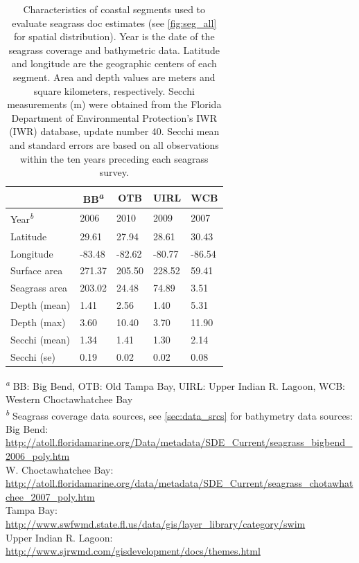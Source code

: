 \documentclass[letterpaper,12pt,oneside]{article}\usepackage[]{graphicx}\usepackage[]{color}
\begin{document}
\begin{table}[!tbp]
\caption{Characteristics of coastal segments used to evaluate seagrass \acl{doc} estimates (see \cref{fig:seg_all} for spatial distribution).  Year is the date of the seagrass coverage and bathymetric data.  Latitude and longitude are the geographic centers of each segment.  Area and depth values are meters and square kilometers, respectively.  Secchi measurements (m) were obtained from the Florida Department of Environmental Protection's \acl{IWR} (\acs{IWR}) database, update number 40.  Secchi mean and standard errors are based on all observations within the ten years preceding each seagrass survey.\label{tab:seg_summ}} 
\begin{center}
\begin{tabular}{lllll}
\hline\hline
\multicolumn{1}{l}{}&\multicolumn{1}{c}{BB\textsuperscript{\textit{a}}}&\multicolumn{1}{c}{OTB}&\multicolumn{1}{c}{UIRL}&\multicolumn{1}{c}{WCB}\tabularnewline
\hline
Year\textsuperscript{\textit{b}}&2006&2010&2009&2007\tabularnewline
Latitude& 29.61& 27.94& 28.61& 30.43\tabularnewline
Longitude&-83.48&-82.62&-80.77&-86.54\tabularnewline
Surface area&271.37&205.50&228.52& 59.41\tabularnewline
Seagrass area&203.02& 24.48& 74.89&  3.51\tabularnewline
Depth (mean)&  1.41&  2.56&  1.40&  5.31\tabularnewline
Depth (max)&  3.60& 10.40&  3.70& 11.90\tabularnewline
Secchi (mean)&  1.34&  1.41&  1.30&  2.14\tabularnewline
Secchi (se)&  0.19&  0.02&  0.02&  0.08\tabularnewline
\hline
\end{tabular}\end{center}

\footnotesize \textsuperscript{\textit{a}} BB: Big Bend, OTB: Old Tampa Bay, UIRL: Upper Indian R. Lagoon, WCB: Western Choctawhatchee Bay\\\textsuperscript{\textit{b}} Seagrass coverage data sources, see \cref{sec:data_srcs} for bathymetry data sources:\scriptsize\\Big Bend: \url{http://atoll.floridamarine.org/Data/metadata/SDE_Current/seagrass_bigbend_2006_poly.htm}\\W. Choctawhatchee Bay: \url{http://atoll.floridamarine.org/data/metadata/SDE_Current/seagrass_chotawhatchee_2007_poly.htm}\\Tampa Bay: \url{http://www.swfwmd.state.fl.us/data/gis/layer_library/category/swim}\\Upper Indian R. Lagoon: \url{http://www.sjrwmd.com/gisdevelopment/docs/themes.html}\end{table}
\end{document}
